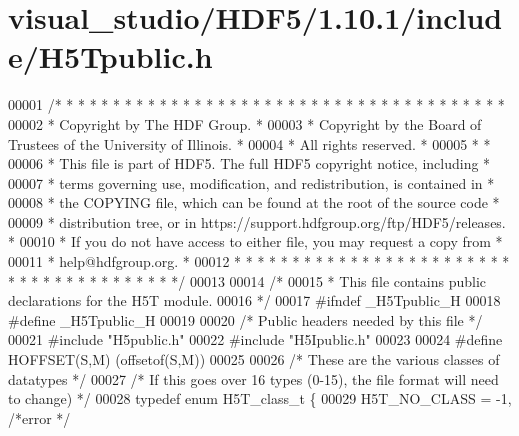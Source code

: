 \hypertarget{visual__studio_2_h_d_f5_21_810_81_2include_2_h5_tpublic_8h_source}{}\section{visual\+\_\+studio/\+H\+D\+F5/1.10.1/include/\+H5\+Tpublic.h}
\label{visual__studio_2_h_d_f5_21_810_81_2include_2_h5_tpublic_8h_source}

\begin{DoxyCode}
00001 \textcolor{comment}{/* * * * * * * * * * * * * * * * * * * * * * * * * * * * * * * * * * * * * * *}
00002 \textcolor{comment}{ * Copyright by The HDF Group.                                               *}
00003 \textcolor{comment}{ * Copyright by the Board of Trustees of the University of Illinois.         *}
00004 \textcolor{comment}{ * All rights reserved.                                                      *}
00005 \textcolor{comment}{ *                                                                           *}
00006 \textcolor{comment}{ * This file is part of HDF5.  The full HDF5 copyright notice, including     *}
00007 \textcolor{comment}{ * terms governing use, modification, and redistribution, is contained in    *}
00008 \textcolor{comment}{ * the COPYING file, which can be found at the root of the source code       *}
00009 \textcolor{comment}{ * distribution tree, or in https://support.hdfgroup.org/ftp/HDF5/releases.  *}
00010 \textcolor{comment}{ * If you do not have access to either file, you may request a copy from     *}
00011 \textcolor{comment}{ * help@hdfgroup.org.                                                        *}
00012 \textcolor{comment}{ * * * * * * * * * * * * * * * * * * * * * * * * * * * * * * * * * * * * * * */}
00013 
00014 \textcolor{comment}{/*}
00015 \textcolor{comment}{ * This file contains public declarations for the H5T module.}
00016 \textcolor{comment}{ */}
00017 \textcolor{preprocessor}{#ifndef \_H5Tpublic\_H}
00018 \textcolor{preprocessor}{#define \_H5Tpublic\_H}
00019 
00020 \textcolor{comment}{/* Public headers needed by this file */}
00021 \textcolor{preprocessor}{#include "H5public.h"}
00022 \textcolor{preprocessor}{#include "H5Ipublic.h"}
00023 
00024 \textcolor{preprocessor}{#define HOFFSET(S,M)    (offsetof(S,M))}
00025 
00026 \textcolor{comment}{/* These are the various classes of datatypes */}
00027 \textcolor{comment}{/* If this goes over 16 types (0-15), the file format will need to change) */}
00028 \textcolor{keyword}{typedef} \textcolor{keyword}{enum} H5T\_class\_t \{
00029     H5T\_NO\_CLASS         = -1,  \textcolor{comment}{/*error                                      */}

\end{DoxyCode}
